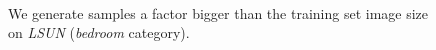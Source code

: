 \documentclass{article}
\begin{document}
\begin{figure}[H]
\vspace{0pt}
    \centering {} \\
    \caption{We generate samples a factor bigger than the training set image size on \emph{LSUN} (\emph{bedroom} category).}
\vspace{0pt}
\end{figure}
\end{document}
